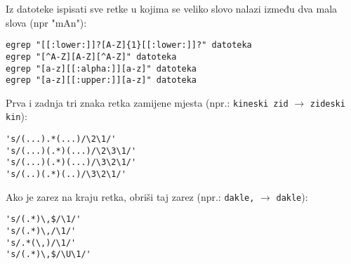 \documentclass[a4paper,11pt]{exam}
\newcommand{\shell}[1]{\texttt{#1}}
\begin{document}
\begin{questions}
	\question
	Iz datoteke ispisati sve retke u kojima se veliko slovo nalazi između dva mala slova (npr "mAn"): 
	
	\begin{oneparchoices}
		\choice \verb|egrep "[[:lower:]]?[A-Z]{1}[[:lower:]]?" datoteka| \\
		\choice \verb|egrep "[^A-Z][A-Z][^A-Z]" datoteka| \\
		\choice \verb|egrep "[a-z][[:alpha:]][a-z]" datoteka| \\
		\CorrectChoice \verb|egrep "[a-z][[:upper:]][a-z]" datoteka|
	\end{oneparchoices}
	
    
\vspace{1em}


	\question Prva i zadnja tri znaka retka zamijene mjesta (npr.: \shell{kineski zid} $\longrightarrow$ \shell{zideski kin}): 
	
	\begin{oneparchoices}
		\choice \verb|'s/(...).*(...)/\2\1/'| \\
		\choice \verb|'s/(...)(.*)(...)/\2\3\1/'| \\
		\CorrectChoice \verb|'s/(...)(.*)(...)/\3\2\1/'| \\
		\choice \verb|'s/(..)(.*)(..)/\3\2\1/'| 
	\end{oneparchoices}
	
	\question Ako je zarez na kraju retka, obriši taj zarez (npr.: \shell{dakle,} $\longrightarrow$ \shell{dakle}): 

	\begin{oneparchoices}
		\CorrectChoice \verb|'s/(.*)\,$/\1/'| \\
		\choice \verb|'s/(.*)\,/\1/'| \\
		\choice \verb|'s/.*(\,)/\1/'| \\
		\choice \verb|'s/(.*)\,$/\U\1/'|
	\end{oneparchoices}

	\vspace{1em}

\end{questions}
\end{document}
